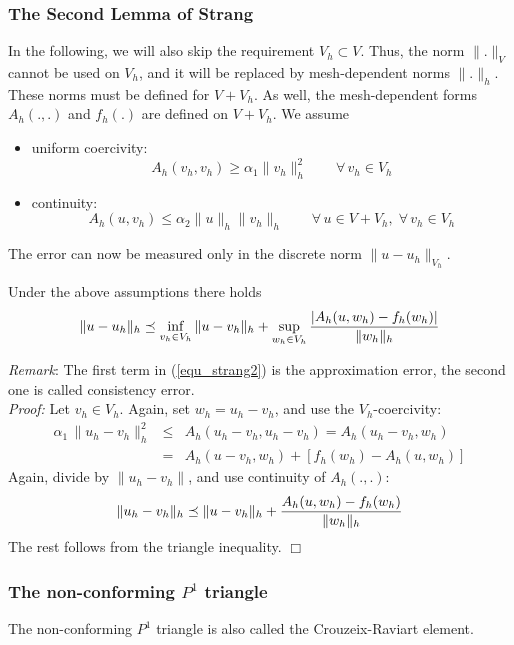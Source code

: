\subsubsection{The Second Lemma of Strang}

In the following, we will also skip the requirement $V_h \subset V$. 
Thus, the norm $\|.\|_V$ cannot be used on $V_h$, and it will be replaced by
mesh-dependent norms $\|.\|_h$. These norms must be defined for $V + V_h$.
As well, the mesh-dependent forms $A_h(.,.)$ and $f_h(.)$ are defined 
on $V + V_h$. We assume 
\begin{itemize}
\item uniform coercivity:
$$
A_h (v_h, v_h) \geq \alpha_1 \| v_h \|_h^2 \qquad \forall \, v_h \in V_h
$$
\item continuity:
$$
A_h (u, v_h) \leq \alpha_2 \| u \|_h \| v_h \|_h \qquad \forall \, u \in V + V_h, \; \forall \, v_h \in V_h
$$
\end{itemize}

The error can now be measured only in the discrete norm $\| u - u_h \|_{V_h}$.
\begin{lemma}
Under the above assumptions there holds
\begin{equation}
\label{equ_strang2}
\| u - u_h \|_h \preceq \inf_{v_h \in V_h} \| u - v_h \|_h +
         \sup_{w_h \in V_h} \frac{| A_h(u,w_h) - f_h(w_h) |}{\| w_h \|_h}
\end{equation}
\end{lemma}
{\em Remark}: The first term in (\ref{equ_strang2}) is the approximation
error, the second one is called consistency error. \\
{\em Proof:} Let $v_h \in V_h$. Again, set $w_h = u_h - v_h$, and
use the $V_h$-coercivity:
\begin{eqnarray*}
\alpha_1 \, \| u_h - v_h \|_h^2 & \leq & A_h (u_h - v_h, u_h - v_h) = A_h (u_h - v_h, w_h) \\
        & = & A_h (u-v_h, w_h) + [f_h(w_h) - A_h(u,w_h)]
\end{eqnarray*}
Again, divide by $\| u_h - v_h\|$, and use continuity of $A_h(.,.)$:
$$
\| u_h - v_h \|_h \preceq \| u - v_h \|_h + \frac{A_h(u,w_h) - f_h(w_h)}{\| w_h \|_h}
$$
The rest follows from the triangle inequality. \hfill $\Box$


\subsubsection{The non-conforming $P^1$ triangle}

The non-conforming $P^1$ triangle is also called the Crouzeix-Raviart element.

